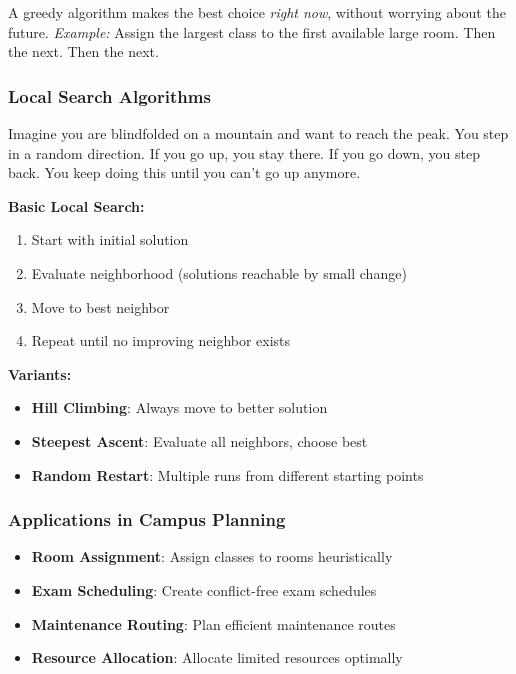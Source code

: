 \documentclass[
  letterpaper,
  DIV=11,
  numbers=noendperiod]{scrreprt}
\providecommand{\tightlist}{%
  \setlength{\itemsep}{0pt}\setlength{\parskip}{0pt}}
\begin{document}
A greedy algorithm makes the best choice \emph{right now}, without
worrying about the future. \emph{Example:} Assign the largest class to
the first available large room. Then the next. Then the next.

\subsubsection{Local Search Algorithms}\label{local-search-algorithms}

Imagine you are blindfolded on a mountain and want to reach the peak.
You step in a random direction. If you go up, you stay there. If you go
down, you step back. You keep doing this until you can't go up anymore.

\textbf{Basic Local Search:}

\begin{enumerate}
\def\labelenumi{\arabic{enumi}.}
\tightlist
\item
  Start with initial solution
\item
  Evaluate neighborhood (solutions reachable by small change)
\item
  Move to best neighbor
\item
  Repeat until no improving neighbor exists
\end{enumerate}

\textbf{Variants:}

\begin{itemize}
\tightlist
\item
  \textbf{Hill Climbing}: Always move to better solution
\item
  \textbf{Steepest Ascent}: Evaluate all neighbors, choose best
\item
  \textbf{Random Restart}: Multiple runs from different starting points
\end{itemize}

\subsubsection{Applications in Campus
Planning}\label{applications-in-campus-planning}

\begin{itemize}
\tightlist
\item
  \textbf{Room Assignment}: Assign classes to rooms heuristically
\item
  \textbf{Exam Scheduling}: Create conflict-free exam schedules
\item
  \textbf{Maintenance Routing}: Plan efficient maintenance routes
\item
  \textbf{Resource Allocation}: Allocate limited resources optimally
\end{itemize}
\end{document}

